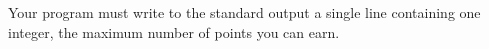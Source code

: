 Your program must write to the standard output a single line containing one integer, the maximum number of points you can earn.